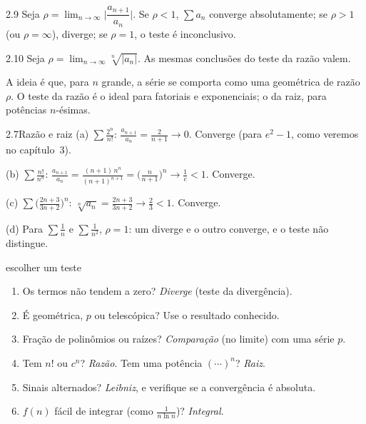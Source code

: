 \begin{teorema}{2.9}
Seja $\rho=\lim_{n\to\infty}\Big|\dfrac{a_{n+1}}{a_n}\Big|$. Se $\rho<1$,
$\sum a_n$ converge absolutamente; se $\rho>1$ (ou $\rho=\infty$), diverge; se $\rho=1$, o teste
é inconclusivo.
\end{teorema}

\begin{teorema}{2.10}
Seja $\rho=\lim_{n\to\infty}\sqrt[n]{|a_n|}$. As mesmas conclusões do teste
da razão valem.
\end{teorema}

A ideia é que, para $n$ grande, a série se comporta como uma geométrica de razão $\rho$. O teste
da razão é o ideal para fatoriais e exponenciais; o da raiz, para potências $n$-ésimas.

\begin{exemplo}{2.7}{Razão e raiz}
(a) $\sum\frac{2^n}{n!}$: $\frac{a_{n+1}}{a_n}=\frac{2}{n+1}\to0$. Converge (para $e^2-1$,
como veremos no capítulo~3).

(b) $\sum\frac{n!}{n^n}$: $\frac{a_{n+1}}{a_n}=\frac{(n+1)\,n^n}{(n+1)^{n+1}}=\big(\frac n{n+1}\big)^n\to\frac1e<1$. Converge.

(c) $\sum\Big(\frac{2n+3}{3n+2}\Big)^n$: $\sqrt[n]{a_n}=\frac{2n+3}{3n+2}\to\frac23<1$. Converge.

(d) Para $\sum\frac1n$ e $\sum\frac1{n^2}$, $\rho=1$: um diverge e o outro converge, e o teste
não distingue.
\end{exemplo}

\begin{estrategia}{escolher um teste}
\begin{enumerate}[label=\arabic*.]
\item Os termos não tendem a zero? \emph{Diverge} (teste da divergência).
\item É geométrica, $p$ ou telescópica? Use o resultado conhecido.
\item Fração de polinômios ou raízes? \emph{Comparação} (no limite) com uma série $p$.
\item Tem $n!$ ou $c^n$? \emph{Razão}. Tem uma potência $(\cdots)^n$? \emph{Raiz}.
\item Sinais alternados? \emph{Leibniz}, e verifique se a convergência é absoluta.
\item $f(n)$ fácil de integrar (como $\frac1{n\ln n}$)? \emph{Integral}.
\end{enumerate}
\end{estrategia}

